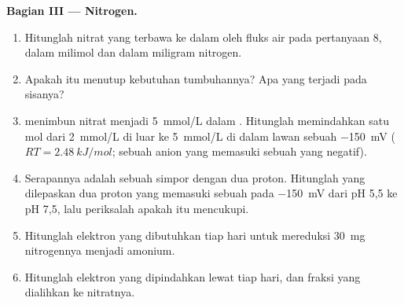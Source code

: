 \begin{problem}
\medskip
\noindent\textbf{Bagian III --- Nitrogen.}
\begin{enumerate}[resume]
  \item Hitunglah nitrat yang terbawa ke dalam  oleh fluks air
        pada pertanyaan 8, dalam milimol dan dalam miligram nitrogen.
  \item Apakah itu menutup kebutuhan tumbuhannya? Apa yang terjadi
        pada sisanya?
  \item {} menimbun nitrat menjadi \qty{5}{mmol/L} dalam .
        Hitunglah  memindahkan satu mol dari
        \qty{2}{mmol/L} di luar ke \qty{5}{mmol/L} di dalam lawan
        sebuah  \qty{-150}{mV} ($RT = \qty{2.48}{kJ/mol}$;
        sebuah anion yang memasuki sebuah  yang negatif).
  \item Serapannya adalah sebuah simpor dengan dua proton. Hitunglah
         yang dilepaskan dua proton yang memasuki sebuah
         pada \qty{-150}{mV} dari pH 5,5 ke pH 7,5, lalu periksalah
        apakah itu mencukupi.
  \item Hitunglah elektron yang dibutuhkan tiap hari untuk mereduksi
        \qty{30}{mg} nitrogennya menjadi amonium.
  \item Hitunglah elektron yang dipindahkan  lewat 
        tiap hari, dan fraksi yang dialihkan ke nitratnya.
\end{enumerate}


\end{problem}
